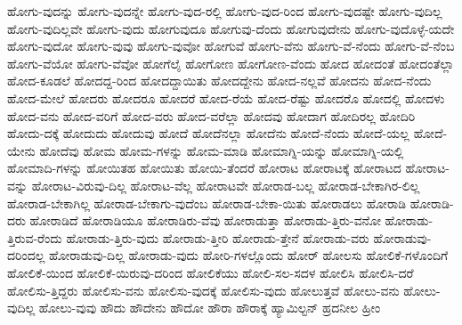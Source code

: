 {ಹೋಗು-ವುದನ್ನು
ಹೋಗು-ವುದನ್ನೇ
ಹೋಗು-ವುದ-ರಲ್ಲಿ
ಹೋಗು-ವುದ-ರಿಂದ
ಹೋಗು-ವುದಷ್ಟೇ
ಹೋಗು-ವುದಿಲ್ಲ
ಹೋಗು-ವುದಿಲ್ಲವೇ
ಹೋಗು-ವುದು
ಹೋಗುವುದೂ
ಹೋಗುವು-ದೆಂದು
ಹೋಗುವುದೇನು
ಹೋಗು-ವುದೊಳ್ಳೆ-ಯದೇ
ಹೋಗು-ವುದೋ
ಹೋಗು-ವುವು
ಹೋಗು-ವುವೋ
ಹೋಗುವೆ
ಹೋಗು-ವೆನು
ಹೋಗು-ವೆ-ನೆಂದು
ಹೋಗು-ವೆ-ನೆಂಬ
ಹೋಗು-ವೆಯೋ
ಹೋಗು-ವೆವೋ
ಹೋಗೆಲೈ
ಹೋಗೋಣ
ಹೋಗೋಣ-ವೆಂದು
ಹೋದ
ಹೋದಂತೆ
ಹೋದಂತೆಲ್ಲಾ
ಹೋದ-ಕೂಡಲೆ
ಹೋದದ್ದ-ರಿಂದ
ಹೋದದ್ದಾಯಿತು
ಹೋದದ್ದೇನು
ಹೋದ-ನಲ್ಲವೆ
ಹೋದನು
ಹೋದ-ನೆಂದು
ಹೋದ-ಮೇಲೆ
ಹೋದರು
ಹೋದರೂ
ಹೋದರೆ
ಹೋದ-ರೆಯೆ
ಹೋದ-ರೆಷ್ಟು
ಹೋದರೊ
ಹೋದಲ್ಲಿ
ಹೋದಳು
ಹೋದ-ವನು
ಹೋದ-ವರಿಗೆ
ಹೋದ-ವರು
ಹೋದ-ವರೆಲ್ಲಾ
ಹೋದವು
ಹೋದಾಗ
ಹೋದಿರಲ್ಲ
ಹೋದಿರಿ
ಹೋದು-ದಕ್ಕೆ
ಹೋದುದು
ಹೋದುವು
ಹೋದೆ
ಹೋದೆನಲ್ಲಾ
ಹೋದೆನು
ಹೋದೆ-ನೆಂದು
ಹೋದೆ-ಯಲ್ಲ
ಹೋದೆ-ಯೇನು
ಹೋದೆವು
ಹೋಮ
ಹೋಮ-ಗಳನ್ನು
ಹೋಮ-ಮಾಡಿ
ಹೋಮಾಗ್ನಿ-ಯನ್ನು
ಹೋಮಾಗ್ನಿ-ಯಲ್ಲಿ
ಹೋಮಾದಿ-ಗಳನ್ನು
ಹೋಯಿತಹ
ಹೋಯಿತು
ಹೋಯಿ-ತೆಂದರೆ
ಹೋರಾಟ
ಹೋರಾಟಕ್ಕೆ
ಹೋರಾಟದ
ಹೋರಾಟ-ವನ್ನು
ಹೋರಾಟ-ವಿರುವು-ದಿಲ್ಲ
ಹೋರಾಟ-ವೆಲ್ಲ
ಹೋರಾಟವೇ
ಹೋರಾಡ-ಬಲ್ಲ
ಹೋರಾಡ-ಬೇಕಾಗಿರ-ಲಿಲ್ಲ
ಹೋರಾಡ-ಬೇಕಾಗಿಲ್ಲ
ಹೋರಾಡ-ಬೇಕಾಗು-ವುದೆಂಬ
ಹೋರಾಡ-ಬೇಕಾ-ಯಿತು
ಹೋರಾಡಲು
ಹೋರಾಡಿ
ಹೋರಾಡಿ-ದರು
ಹೋರಾಡಿದೆ
ಹೋರಾಡಿಯೂ
ಹೋರಾಡಿರು-ವೆವು
ಹೋರಾಡುತ್ತಾ
ಹೋರಾಡು-ತ್ತಿರು-ವನೋ
ಹೋರಾಡು-ತ್ತಿರುವ-ರೆಂದು
ಹೋರಾಡು-ತ್ತಿರು-ವುದು
ಹೋರಾಡು-ತ್ತೀರಿ
ಹೋರಾಡು-ತ್ತೇನೆ
ಹೋರಾಡು-ವರು
ಹೋರಾಡುವು-ದರಿಂದಲ್ಲ
ಹೋರಾಡುವು-ದಿಲ್ಲ
ಹೋರಾಡು-ವುದು
ಹೋರಿ-ಗಳಲ್ಲೊಂದು
ಹೋರ್
ಹೋಲಸು
ಹೋಲಿಕೆ-ಗಳೊಂದಿಗೆ
ಹೋಲಿಕೆ-ಯಿಂದ
ಹೋಲಿಕೆ-ಯಿರುವು-ದರಿಂದ
ಹೋಲಿಕೆಯು
ಹೋಲಿ-ಸಲ-ಸದಳ
ಹೋಲಿಸಿ
ಹೋಲಿಸಿ-ದರೆ
ಹೋಲಿಸು-ತ್ತಿದ್ದರು
ಹೋಲಿಸು-ವನು
ಹೋಲಿಸು-ವುದಕ್ಕೆ
ಹೋಲಿಸು-ವುದು
ಹೋಲುತ್ತವೆ
ಹೋಲು-ವನು
ಹೋಲು-ವುದಿಲ್ಲ
ಹೋಲು-ವುವು
ಹೌದು
ಹೌದೇನು
ಹೌದೋ
ಹೌರಾ
ಹೌರಾಕ್ಕೆ
ಹ್ಯಾಮಿಲ್ಟನ್
ಹ್ರದನೀಲ
ಹ್ರೀಂ
}
